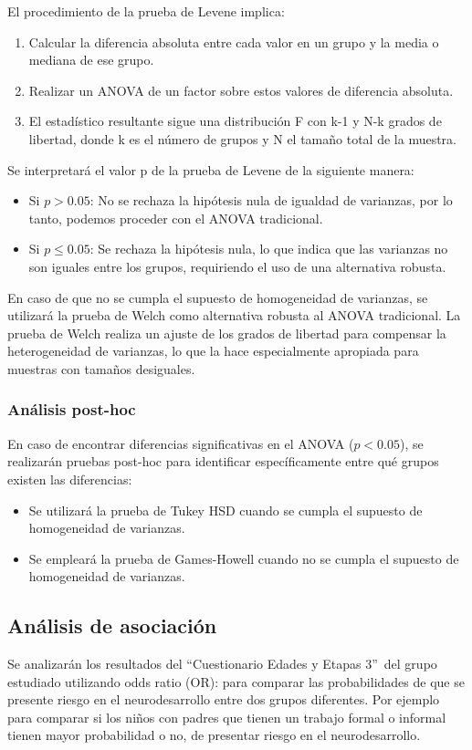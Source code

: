 \documentclass[11pt,letterpaper]{report}
\newcommand{\asq}{“Cuestionario Edades y Etapas 3”}
\begin{document}
El procedimiento de la prueba de Levene implica:
\begin{enumerate}
    \item Calcular la diferencia absoluta entre cada valor en un grupo y la
		media o mediana de ese grupo.
    \item Realizar un ANOVA de un factor sobre estos valores de diferencia
		absoluta.
    \item El estadístico resultante sigue una distribución F con k-1 y N-k
		grados de libertad, donde k es el número de grupos y N el tamaño total
		de la muestra.
\end{enumerate}

Se interpretará el valor p de la prueba de Levene de la siguiente manera:
\begin{itemize}
    \item Si $p > 0.05$: No se rechaza la hipótesis nula de igualdad de
		varianzas, por lo tanto, podemos proceder con el ANOVA tradicional.
    \item Si $p \leq0.05$: Se rechaza la hipótesis nula, lo que indica que las
		varianzas no son iguales entre los grupos, requiriendo el uso de una
		alternativa robusta.
\end{itemize}

En caso de que no se cumpla el supuesto de homogeneidad de varianzas, se
utilizará la prueba de Welch como alternativa robusta al ANOVA tradicional. La
prueba de Welch realiza un ajuste de los grados de libertad para compensar la
heterogeneidad de varianzas, lo que la hace especialmente apropiada para
muestras con tamaños desiguales.

\subsubsection{Análisis post-hoc}
En caso de encontrar diferencias significativas en el ANOVA ($p < 0.05$), se
realizarán pruebas post-hoc para identificar específicamente entre qué grupos
existen las diferencias:

\begin{itemize}
    \item Se utilizará la prueba de Tukey HSD cuando se cumpla el supuesto de
    homogeneidad de varianzas.
    \item Se empleará la prueba de Games-Howell cuando no se cumpla el supuesto
    de homogeneidad de varianzas.
\end{itemize}

\subsection{Análisis de asociación}
Se analizarán los resultados del \asq\ del grupo estudiado utilizando odds
ratio (OR): para comparar las probabilidades de que se presente riesgo en el
neurodesarrollo entre dos grupos diferentes. Por ejemplo para comparar si los
niños con padres que tienen un trabajo formal o informal tienen mayor
probabilidad o no, de presentar riesgo en el neurodesarrollo.
\end{document}
